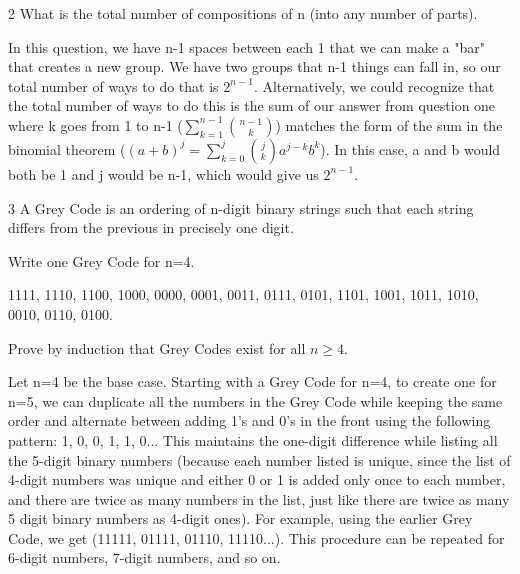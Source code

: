 
\begin{problem} 2
    What is the total number of compositions of n (into any number of parts).
\end{problem}
\begin{solution}
    In this question, we have n-1 spaces between each 1 that we can make a "bar" that creates a new group. We have two groups that n-1 things can fall in, so our total number of ways to do that is \(2^{n-1}\). Alternatively, we could recognize that the total number of ways to do this is the sum of our answer from question one where k goes from 1 to n-1 (\(\sum^{n-1}_{k=1}\binom{n-1}{k}\)) matches the form of the sum in the binomial theorem (\((a+b)^{j} = \sum^{j}_{k=0}\binom{j}{k}a^{j-k}b^{k}\)). In this case, a and b would both be 1 and j would be n-1, which would give us \(2^{n-1}\).
\end{solution}


\begin{problem} 3
    A Grey Code is an ordering of n-digit binary strings such that each string differs from the previous in precisely one digit.
\end{problem}



\begin{problem}{3.1}
    {Write one Grey Code for n=4.}
\end{problem}
1111, 1110, 1100, 1000, 0000, 0001, 0011, 0111, 0101, 1101, 1001, 1011, 1010, 0010, 0110, 0100.


\begin{problem}{3.2}{Prove by induction that Grey Codes exist for all $n \geq{4}$.}\end{problem}
Let n=4 be the base case. Starting with a Grey Code for n=4, to create one for n=5, we can duplicate all the numbers in the Grey Code while keeping the same order and alternate between adding 1's and 0's in the front using the following pattern: 1, 0, 0, 1, 1, 0... This maintains the one-digit difference while listing all the 5-digit binary numbers (because each number listed is unique, since the list of 4-digit numbers was unique and either 0 or 1 is added only once to each number, and there are twice as many numbers in the list, just like there are twice as many 5 digit binary numbers as 4-digit ones). For example, using the earlier Grey Code, we get (11111, 01111, 01110, 11110...). This procedure can be repeated for 6-digit numbers, 7-digit numbers, and so on.

